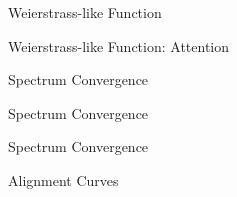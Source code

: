 \documentclass[11pt]{article}
\theoremstyle{plain}
\begin{document}
\begin{figure}%
    \centering
    \qquad
    \caption{Weierstrass-like Function}%
    \label{fig:example}%
\end{figure}
\begin{figure}%
    \centering
    \qquad
    \caption{Weierstrass-like Function: Attention}%
    \label{fig:example}%
\end{figure}




\begin{figure}%
    \centering
    \qquad
    \caption{Spectrum Convergence}%
    \label{fig:example}%
\end{figure}

\begin{figure}%
    \centering
    \qquad
    \caption{Spectrum Convergence}%
    \label{fig:example}%
\end{figure}

\begin{figure}%
    \centering
    \qquad
    \caption{Spectrum Convergence}%
    \label{fig:example}%
\end{figure}


\begin{figure}%
    \centering
    \caption{Alignment Curves}%
    \label{fig:example}%
\end{figure}
\end{document}
